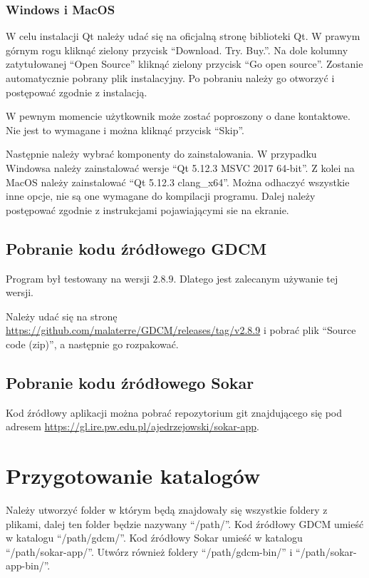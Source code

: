 \subsubsection*{Windows i MacOS}

\par
W celu instalacji Qt należy udać się na oficjalną stronę biblioteki Qt.
W prawym górnym rogu kliknąć zielony przycisk \enquote{Download. Try. Buy.}.
Na dole kolumny zatytułowanej \enquote{Open Source} kliknąć zielony przycisk \enquote{Go open source}.
Zostanie automatycznie pobrany plik instalacyjny.
Po pobraniu należy go otworzyć i postępować zgodnie z instalacją.
\par
W pewnym momencie użytkownik może zostać poproszony o dane kontaktowe.
Nie jest to wymagane i można kliknąć przycisk \enquote{Skip}.
\par
Następnie należy wybrać komponenty do zainstalowania.
W przypadku Windowsa należy zainstalować wersje \enquote{Qt 5.12.3 MSVC 2017 64-bit}.
Z kolei na MacOS należy zainstalować \enquote{Qt 5.12.3 clang\_x64}.
Można odhaczyć wszystkie inne opcje, nie są one wymagane do kompilacji programu.
Dalej należy postępować zgodnie z instrukcjami pojawiającymi sie na ekranie.

\subsection{Pobranie kodu źródłowego GDCM}

Program był testowany na wersji $2.8.9$.
Dlatego jest zalecanym używanie tej wersji.
\par
Należy udać się na stronę \url{https://github.com/malaterre/GDCM/releases/tag/v2.8.9} i pobrać plik \enquote{Source code (zip)}, a następnie go rozpakować.

\subsection{Pobranie kodu źródłowego Sokar}

Kod źródłowy aplikacji można pobrać repozytorium git znajdującego się pod adresem \url{https://gl.ire.pw.edu.pl/ajedrzejowski/sokar-app}.

\section{Przygotowanie katalogów}

Należy utworzyć folder w którym będą znajdowały się wszystkie foldery z plikami, dalej ten folder będzie nazywany \enquote{/path/}.
Kod źródłowy GDCM umieść w katalogu \enquote{/path/gdcm/}.
Kod źródłowy Sokar umieść w katalogu \enquote{/path/sokar-app/}.
Utwórz również foldery \enquote{/path/gdcm-bin/} i \enquote{/path/sokar-app-bin/}.

